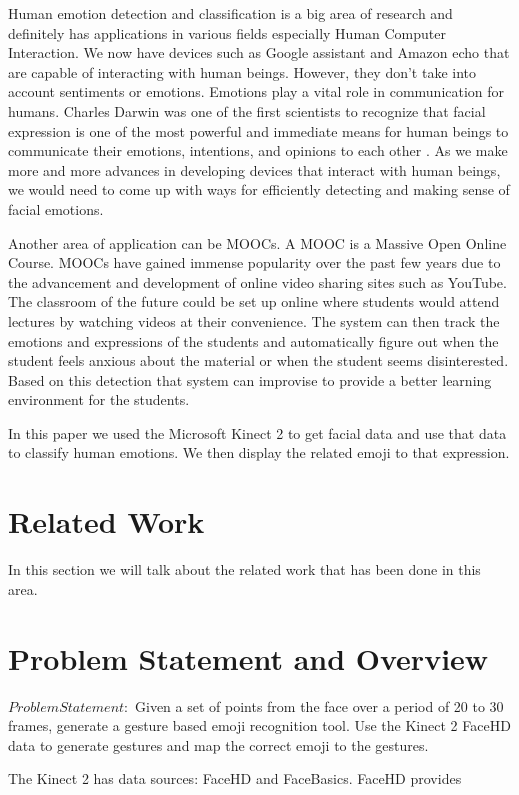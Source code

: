 \documentclass{sigchi}
\begin{document}
Human emotion detection and classification is a big area of research and
definitely has applications in various fields especially Human Computer
Interaction. We now have devices such as Google assistant and Amazon echo that
are capable of interacting with human beings. However, they don't take into
account sentiments or emotions. Emotions play a vital role in communication for
humans.  Charles Darwin was one of the first scientists to recognize that facial
expression is one of the most powerful and immediate means for human beings to
communicate their emotions, intentions, and opinions to each other
\cite{bartlett2003real}. As we make more and more advances in developing devices
that interact with human beings, we would need to come up with ways for
efficiently detecting and making sense of facial emotions. 

Another area of application can be MOOCs. A MOOC is a Massive Open Online
Course. MOOCs have gained immense popularity over the past few years due to the
advancement and development of online video sharing sites such as YouTube. The
classroom of the future could be set up online where students would attend
lectures by watching videos at their convenience. The system can then track the
emotions and expressions of the students and automatically figure out when the
student feels anxious about the material or when the student seems
disinterested. Based on this detection that system can improvise to provide a
better learning environment for the students.

In this paper we used the Microsoft Kinect 2 to get facial data and use that
data to classify human emotions. We then display the related emoji to that
expression. 


\section{Related Work} In this section we will talk about the related work that
has been done in this area. 

\section{Problem Statement and Overview} $Problem Statement:$ Given a set of
points from the face over a period of 20 to 30 frames, generate a gesture based
emoji recognition tool. Use the Kinect 2 FaceHD data to generate gestures and
map the correct emoji to the gestures.

The Kinect 2 has data sources: FaceHD and FaceBasics. FaceHD provides 
\end{document}
